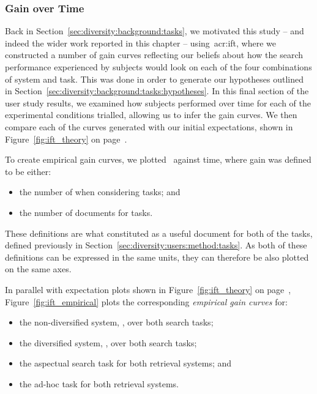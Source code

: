 \subsubsection{Gain over Time}\label{sec:diversity:users:results:ift}
Back in Section~\ref{sec:diversity:background:tasks}, we motivated this study -- and indeed the wider work reported in this chapter -- using~\gls{acr:ift}, where we constructed a number of gain curves reflecting our beliefs about how the search performance experienced by subjects would look on each of the four combinations of system and task. This was done in order to generate our hypotheses outlined in Section~\ref{sec:diversity:background:tasks:hypotheses}. In this final section of the user study results, we examined how subjects performed over time for each of the experimental conditions trialled, allowing us to infer the gain curves. We then compare each of the curves generated with our initial expectations, shown in Figure~\ref{fig:ift_theory} on page~\pageref{fig:ift_theory}.

To create empirical gain curves, we plotted~ against time, where gain was defined to be either:

\begin{itemize}
    \item{the number of  when considering  tasks; and}
    \item{the number of  documents for  tasks.}
\end{itemize}

These definitions are what constituted as a useful document for both of the tasks, defined previously in Section~\ref{sec:diversity:users:method:tasks}. As both of these definitions can be expressed in the same units, they can therefore be also plotted on the same axes.

In parallel with expectation plots shown in Figure~\ref{fig:ift_theory} on page~\pageref{fig:ift_theory}, Figure~\ref{fig:ift_empirical} plots the corresponding \emph{empirical gain curves} for:

\begin{itemize}
    \item[\genericblack{(a)}]{the non-diversified system, , over both search tasks;}
    \item[\genericblack{(b)}]{the diversified system, , over both search tasks;}
    \item[\genericblack{(c)}]{the aspectual search task for both retrieval systems; and}
    \item[\genericblack{(d)}]{the ad-hoc task for both retrieval systems.}
\end{itemize}

